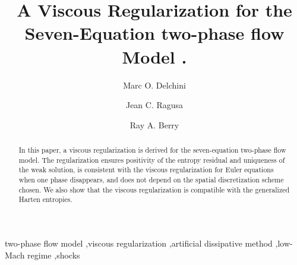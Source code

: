 \documentclass[preprint,10pt]{elsarticle}
\begin{document}
\begin{frontmatter}


\title{A Viscous Regularization for the Seven-Equation two-phase flow Model . }
\author{Marc O. Delchini}
%
\author{Jean C. Ragusa}
%
\author{Ray A. Berry}
%
\address[label1]{Department of Nuclear Engineering, Texas A\&M University, College Station, TX 77843, USA }
%
\address[label2]{Idaho National Laboratory, Idaho Falls, ID 83415, USA }
%
\begin{abstract}
In this paper, a viscous regularization is derived for the seven-equation two-phase flow model. The regularization ensures positivity of the entropy residual and uniqueness of the weak solution, %
is consistent with the viscous regularization for Euler equations when one phase disappears, and does not depend on the spatial discretization scheme chosen. We also show that the viscous regularization is compatible with the generalized Harten entropies.
\end{abstract}
\begin{keyword}
  two-phase flow model \sep viscous regularization \sep artificial dissipative method \sep low-Mach regime \sep shocks 
\end{keyword}
\end{frontmatter}
%
\linenumbers
%
\end{document}
